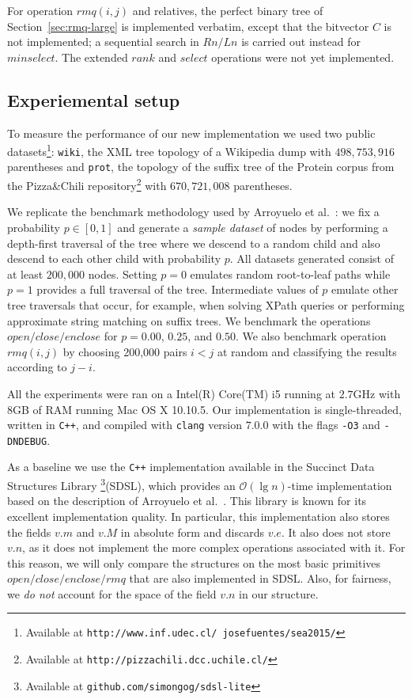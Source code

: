 \documentclass[11pt]{article}
\newcommand{\url}[1]{{\tt #1}}
\renewcommand{\log}{\lg}
\newcommand{\0}{\mathit{0}}
\newcommand{\1}{\mathit{1}}
\newcommand{\rank}{\mathit{rank}}
\newcommand{\select}{\mathit{select}}
\newcommand{\close}{\mathit{close}}
\newcommand{\open}{\mathit{open}}
\newcommand{\enclose}{\mathit{enclose}}
\newcommand{\rmq}{\mathit{rmq}}
\newcommand{\minselect}{\mathit{minselect}}
\newcommand{\Oh}[1]{\mathcal{O}\!\left(#1\right)}
\begin{document}
For operation $\rmq(i, j)$ and relatives, the perfect binary tree of 
Section~\ref{sec:rmq-large} is implemented verbatim, except that the bitvector
$C$ is not implemented; a sequential search in $Rn/Ln$ is carried out instead
for $\minselect$. The extended $\rank$ and $\select$ operations were not yet
implemented.

\subsection{Experiemental setup}

To measure the performance of our new implementation we used two public
datasets\footnote{Available at
\url{http://www.inf.udec.cl/~josefuentes/sea2015/}}: \texttt{wiki}, the XML tree
topology of a Wikipedia dump with $498,753,916$ parentheses and \texttt{prot},
the topology of the suffix tree of the Protein corpus from the Pizza\&Chili
repository\footnote{Available at \url{http://pizzachili.dcc.uchile.cl/}} with
$670,721,008$ parentheses. 

We replicate the benchmark methodology used by
Arroyuelo et al.~\cite{ACNS10}: we fix a probability $p \in [0, 1]$ and generate a
\emph{sample dataset} of nodes by performing a depth-first traversal of the tree
where we descend to a random child and also descend to each other child
with probability $p$.  All datasets generated consist of at least
$200,000$ nodes.  Setting $p=0$ emulates random root-to-leaf
paths while $p=1$ provides a full traversal of the tree. Intermediate
values of $p$ emulate other tree traversals that occur, for example,
when solving XPath queries or performing approximate string matching on suffix 
trees. We benchmark the operations $\open/\close/\enclose$ for $p=0.00$,
$0.25$, and $0.50$. We also benchmark operation $\rmq(i,j)$ by choosing 
200,000 pairs $i<j$ at random and classifying the results according to $j-i$.

All the experiments were ran on a Intel(R) Core(TM) i5 running at $2.7$GHz with
$8$GB of RAM running Mac OS X 10.10.5.  Our implementation is single-threaded,
written in \texttt{C++}, and compiled with \texttt{clang} version
$7.0.0$ with the flags \texttt{-O3} and \texttt{-DNDEBUG}.

As a baseline we use the \texttt{C++} implementation available in the
Succinct Data Structures Library \footnote{Available at
\url{github.com/simongog/sdsl-lite}}(SDSL), which provides an $\Oh{\log n}$-time
implementation based on the description of Arroyuelo et al.~\cite{ACNS10}.
This library is known for its excellent implementation quality. In particular,
this implementation also stores the fields $v.m$ and $v.M$ in absolute form
and discards $v.e$. It also does not store $v.n$, as it does not implement the
more complex operations associated with it. For this reason, we will only
compare the structures on the most basic primitives 
$\open/\close/\enclose/\rmq$ that are also implemented in SDSL. Also, for 
fairness, we {\em do not} account for the space of the field $v.n$ in our
structure.
\end{document}
